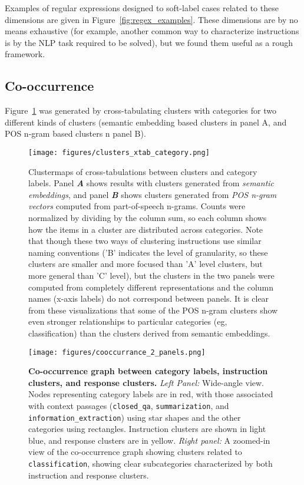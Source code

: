 Examples of regular expressions designed to soft-label cases related to these dimensions are given in Figure~\ref{fig:regex_examples}. These dimensions are by no means exhaustive (for example, another common way to characterize instructions is by the NLP task required to be solved), but we found them useful as a rough framework.

\subsection{Co-occurrence}

Figure~\ref{fig:clusters_xtab_category} was generated by cross-tabulating clusters with categories for two different kinds of clusters (semantic embedding based clusters in panel A, and POS n-gram based clusters n panel B).


\begin{figure}
  \centering
  \texttt{[image: figures/clusters\_xtab\_category.png]}
  \caption{Clustermaps of cross-tabulations between clusters and category labels. Panel \textbf{\emph{A}} shows results with clusters generated from \emph{semantic embeddings}, and panel \textbf{\emph{B}} shows clusters generated from \emph{POS n-gram vectors} computed from part-of-speech n-grams. Counts were normalized by dividing by the column sum, so each column shows how the items in a cluster are distributed across categories. Note that though these two ways of clustering instructions use similar naming conventions ('B' indicates the level of granularity, so these clusters are smaller and more focused than 'A' level clusters, but more general than 'C' level), but the clusters in the two panels were computed from completely different representations and the column names (x-axis labels) do not correspond between panels. It is clear from these visualizations that some of the POS n-gram clusters show even stronger relationships to particular categories (eg, classification) than the clusters derived from semantic embeddings.}
  \label{fig:clusters_xtab_category}
\end{figure}

\begin{figure}
  \centering
  \texttt{[image: figures/cooccurrance\_2\_panels.png]}
  \caption{
   \textbf{Co-occurrence graph between category labels, instruction clusters, and response clusters.} \emph{Left Panel:} Wide-angle view. Nodes representing category labels are in red, with those associated with context passages (\texttt{closed\_qa}, \texttt{summarization}, and \texttt{information\_extraction}) using star shapes and the other categories using rectangles. Instruction clusters are shown in light blue, and response clusters are in yellow.
  \emph{Right panel:} A zoomed-in view of the co-occurrence graph showing clusters related to \texttt{classification}, showing clear subcategories characterized by both instruction and response clusters.
  }
  \label{fig:cooccurrance_2_panels}
\end{figure}


